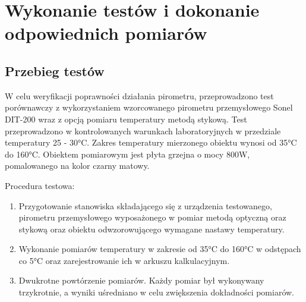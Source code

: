 \chapter{Wykonanie testów i dokonanie odpowiednich pomiarów}
\section{Przebieg testów}

W celu weryfikacji poprawności działania pirometru, przeprowadzono test porównawczy z wykorzystaniem wzorcowanego pirometru przemysłowego Sonel DIT-200 wraz z opcją pomiaru temperatury metodą stykową. Test przeprowadzono w kontrolowanych warunkach laboratoryjnych w przedziale temperatury 25 - 30°C. Zakres temperatury mierzonego obiektu wynosi od 35°C do 160°C. Obiektem pomiarowym jest płyta grzejna o mocy 800W, pomalowanego na kolor czarny matowy.

\vspace{12pt}

Procedura testowa:
\begin{enumerate}
\item Przygotowanie stanowiska składającego się z urządzenia testowanego,  pirometru przemysłowego wyposażonego w pomiar metodą optyczną oraz stykową oraz obiektu odwzorowującego wymagane nastawy temperatury. \item Wykonanie pomiarów temperatury w zakresie od 35°C do 160°C w odstępach co 5°C oraz zarejestrowanie ich w arkuszu kalkulacyjnym. \item Dwukrotne powtórzenie pomiarów. Każdy pomiar był wykonywany trzykrotnie, a wyniki uśredniano w celu zwiększenia dokładności pomiarów.
\end{enumerate}

\newpage

